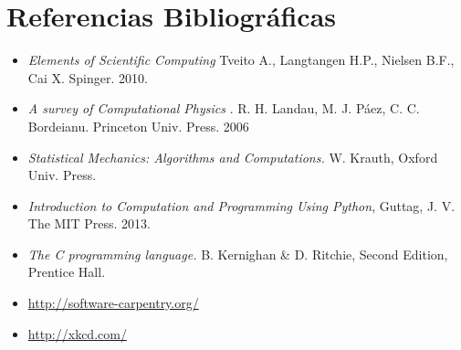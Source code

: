 \documentclass[11pt]{article}
\begin{document}
\section*{Referencias Bibliogr\'aficas}

\begin{itemize}
\item
\textit{Elements of Scientific Computing}
Tveito A., Langtangen H.P., Nielsen B.F., Cai X. Spinger. 2010.
\item
\textit{A survey of Computational Physics}
. R. H. Landau, M. J. P\'aez, C. C. Bordeianu. Princeton Univ. Press. 2006
\item 
\textit{Statistical Mechanics: Algorithms and Computations.}
W. Krauth, Oxford Univ. Press. 
\item 
\textit{Introduction to Computation and Programming Using Python},
Guttag, J. V. The MIT Press. 2013.
\item 
\textit{The C programming language.}
 B. Kernighan \& D. Ritchie, Second Edition, Prentice Hall.
\item\url{http://software-carpentry.org/}
\item\url{http://xkcd.com/}
\end{itemize}

 
\end{document}
